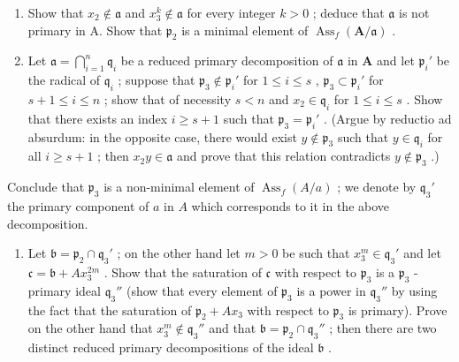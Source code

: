 \begin{enumerate}
\def\labelenumi{(\alph{enumi})}
\item
  Show that \(x_{2} \notin \mathfrak{a}\) and \(x_{3}^{k} \notin \mathfrak{a}\) for every integer \(k > 0\) ; deduce that \(\mathfrak{a}\) is not primary in A. Show that \(\mathfrak{p}_{2}\) is a minimal element of \(\operatorname{Ass}_f(\mathbf{A} / \mathfrak{a})\) .
\item
  Let \(\mathfrak{a} = \bigcap_{i=1}^{n} \mathfrak{q}_i\) be a reduced primary decomposition of \(\mathfrak{a}\) in \(\mathbf{A}\) and let \(\mathfrak{p}_i'\) be the radical of \(\mathfrak{q}_i\) ; suppose that \(\mathfrak{p}_3 \notin \mathfrak{p}_i'\) for \(1 \leqslant i \leqslant s\) , \(\mathfrak{p}_3 \subset \mathfrak{p}_i'\) for \(s + 1 \leqslant i \leqslant n\) ; show that of necessity \(s < n\) and \(x_2 \in \mathfrak{q}_i\) for \(1 \leqslant i \leqslant s\) . Show that there exists an index \(i \geqslant s + 1\) such that \(\mathfrak{p}_3 = \mathfrak{p}_i'\) . (Argue by reductio ad absurdum: in the opposite case, there would exist \(y \notin \mathfrak{p}_3\) such that \(y \in \mathfrak{q}_i\) for all \(i \geqslant s + 1\) ; then \(x_2y \in \mathfrak{a}\) and prove that this relation contradicts \(y \notin \mathfrak{p}_3\) .)
\end{enumerate}

Conclude that \(\mathfrak{p}_3\) is a non-minimal element of \(\operatorname{Ass}_f(A / a)\) ; we denote by \(\mathfrak{q}_3'\) the primary component of \(a\) in \(A\) which corresponds to it in the above decomposition.

\begin{enumerate}
\def\labelenumi{(\alph{enumi})}
\setcounter{enumi}{2}
\tightlist
\item
  Let \(\mathfrak{b} = \mathfrak{p}_2 \cap \mathfrak{q}_3'\) ; on the other hand let \(m > 0\) be such that \(x_3^m \in \mathfrak{q}_3'\) and let \(\mathfrak{c} = \mathfrak{b} + Ax_3^{2m}\) . Show that the saturation of \(\mathfrak{c}\) with respect to \(\mathfrak{p}_3\) is a \(\mathfrak{p}_3\) -primary ideal \(\mathfrak{q}_3''\) (show that every element of \(\mathfrak{p}_3\) is a power in \(\mathfrak{q}_3''\) by using the fact that the saturation of \(\mathfrak{p}_2 + Ax_3\) with respect to \(\mathfrak{p}_3\) is primary). Prove on the other hand that \(x_3^m \notin \mathfrak{q}_3''\) and that \(\mathfrak{b} = \mathfrak{p}_2 \cap \mathfrak{q}_3''\) ; then there are two distinct reduced primary decompositions of the ideal \(\mathfrak{b}\) .
\end{enumerate}

